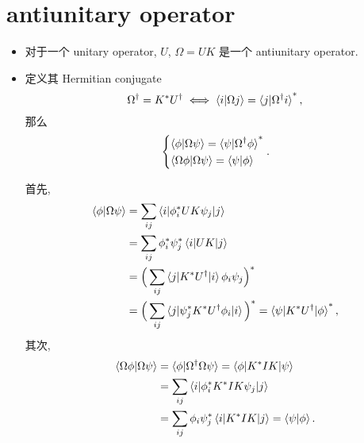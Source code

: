 \section{antiunitary operator}
\begin{itemize}
	\item 对于一个 unitary operator, $U$, $\Omega = U K$ 是一个 antiunitary operator.
	
	\item 定义其 Hermitian conjugate
	\begin{equation}
		\Omega^\dag = K^* U^\dag \iff \braket{i | \Omega j} = \braket{j | \Omega^\dag i}^*,
	\end{equation}
	那么
	\begin{equation}
		\begin{dcases}
			\braket{\phi | \Omega \psi} = \braket{\psi | \Omega^\dag \phi}^* \\
			\braket{\Omega \phi | \Omega \psi} = \braket{\psi | \phi}
		\end{dcases}.
	\end{equation}
	
	\begin{tcolorbox}[title=proof:]
		首先,
		\begin{align}
			\braket{\phi | \Omega \psi} &= \sum_{i j} \braket{i | \phi^*_i U K \psi_j | j} \notag \\
			&= \sum_{i j} \phi^*_i \psi^*_j \braket{i | U K | j} \notag \\
			&= \Big( \sum_{i j} \braket{j | K^* U^\dag | i} \phi_i \psi_j \Big)^* \notag \\
			&= \Big( \sum_{i j} \braket{j | \psi^*_j K^* U^\dag \phi_i | i} \Big)^* = \braket{\psi | K^* U^\dag | \phi}^*,
		\end{align}
		其次,
		\begin{align}
			\braket{\Omega \phi | \Omega \psi} &= \braket{\phi | \Omega^\dag \Omega \psi} = \braket{\phi | K^* I K | \psi} \notag \\
			&= \sum_{i j} \braket{i | \phi^*_i K^* I K \psi_j | j} \notag \\
			&= \sum_{i j} \phi_i \psi^*_j \braket{i | K^* I K | j} = \braket{\psi | \phi}.
		\end{align}
	\end{tcolorbox}
\end{itemize}

